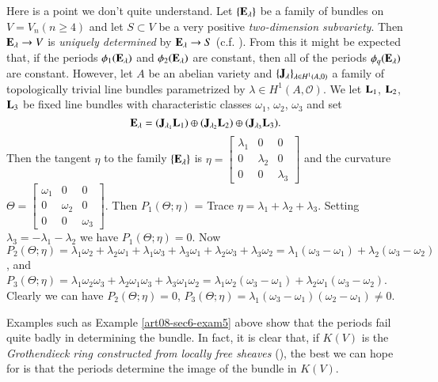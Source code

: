 \begin{example}\label{art08-sec6-exam5}
Here is a point we don't quite understand. Let $\{\mathbf{E}_{\lambda}\}$ be a family of bundles on $V=V_{n}(n\geq 4)$ and let $S\subset V$ be a very positive {\em two-dimension subvariety}. Then $\mathbf{E}_{\lambda}\to V$ is {\em uniquely determined} by $\mathbf{E}_{\lambda}\to S$ (c.f. \cite{art08-key8}). From this it might be expected that, if the periods $\phi_{1}(\mathbf{E}_{\lambda})$ and $\phi_{2}(\mathbf{E}_{\lambda})$ are constant, then all of the periods $\phi_{q}(\mathbf{E}_{\lambda})$ are constant. However, let $A$ be an abelian variety and $\{\mathbf{J}_{\lambda}\}_{\lambda\in H^{1}(A,0)}$ a family of topologically trivial line bundles parametrized by $\lambda\in H^{1}(A,\mathcal{O})$. We let $\mathbf{L}_{1}$, $\mathbf{L}_{2}$, $\mathbf{L}_{3}$ be fixed line bundles with characteristic classes $\omega_{1}$, $\omega_{2}$, $\omega_{3}$ and set
$$
\mathbf{E}_{\lambda}=(\mathbf{J}_{\lambda_{1}}\mathbf{L}_{1})\oplus (\mathbf{J}_{\lambda_{2}}\mathbf{L}_{2})\oplus (\mathbf{J}_{\lambda_{3}}\mathbf{L}_{3}).
$$
Then the tangent $\eta$ to the family $\{\mathbf{E}_{\lambda}\}$ is $\eta=\left[\begin{smallmatrix} \lambda_{1} & 0 & 0\\ 0 & \lambda_{2} & 0\\ 0 & 0 & \lambda_{3}\end{smallmatrix}\right]$ and the curvature $\Theta=\left[\begin{smallmatrix} \omega_{1} & 0 & 0\\ 0 & \omega_{2} & 0\\ 0 & 0 & \omega_{3}\end{smallmatrix}\right]$. Then $P_{1}(\Theta;\eta)$ = Trace $\eta=\lambda_{1}+\lambda_{2}+\lambda_{3}$. Setting $\lambda_{3}=-\lambda_{1}-\lambda_{2}$ we have $P_{1}(\Theta;\eta)=0$. Now $P_{2}(\Theta;\eta)=\lambda_{1}\omega_{2}+\lambda_{2}\omega_{1}+\lambda_{1}\omega_{3}+\lambda_{3}\omega_{1}+\lambda_{2}\omega_{3}+\lambda_{3}\omega_{2}=\lambda_{1}(\omega_{3}-\omega_{1})+\lambda_{2}(\omega_{3}-\omega_{2})$, and $P_{3}(\Theta;\eta)=\lambda_{1}\omega_{2}\omega_{3}+\lambda_{2}\omega_{1}\omega_{3}+\lambda_{3}\omega_{1}\omega_{2}=\lambda_{1}\omega_{2}(\omega_{3}-\omega_{1})+\lambda_{2}\omega_{1}(\omega_{3}-\omega_{2})$. Clearly we can have $P_{2}(\Theta;\eta)=0$, $P_{3}(\Theta;\eta)=\lambda_{1}(\omega_{3}-\omega_{1})(\omega_{2}-\omega_{1})\neq 0$.
\end{example}

\begin{example}\label{art08-sec6-exam6}
Examples such as Example \ref{art08-sec6-exam5} above show that the periods fail quite badly in determining the bundle. In fact, it is clear that, if $K(V)$ is the {\em Grothendieck ring constructed from locally free sheaves} (\cite{art08-key12}), the best we can hope for is that the periods determine the image of the bundle in $K(V)$.
\end{example}

